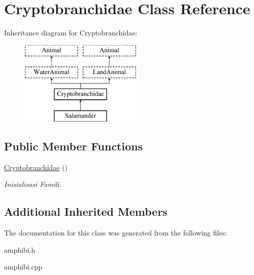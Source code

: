 \hypertarget{class_cryptobranchidae}{}\section{Cryptobranchidae Class Reference}
\label{class_cryptobranchidae}
Inheritance diagram for Cryptobranchidae\+:\begin{figure}[H]
\begin{center}
\leavevmode
\includegraphics[height=4.000000cm]{class_cryptobranchidae}
\end{center}
\end{figure}
\subsection*{Public Member Functions}
\begin{DoxyCompactItemize}
\item 
\hyperlink{class_cryptobranchidae_a2924085c15b671b75ee16d994665e720}{Cryptobranchidae} ()\hypertarget{class_cryptobranchidae_a2924085c15b671b75ee16d994665e720}{}\label{class_cryptobranchidae_a2924085c15b671b75ee16d994665e720}

\begin{DoxyCompactList}\small\item\em Inisialisasi Famili. \end{DoxyCompactList}\end{DoxyCompactItemize}
\subsection*{Additional Inherited Members}


The documentation for this class was generated from the following files\+:\begin{DoxyCompactItemize}
\item 
amphibi.\+h\item 
amphibi.\+cpp\end{DoxyCompactItemize}
